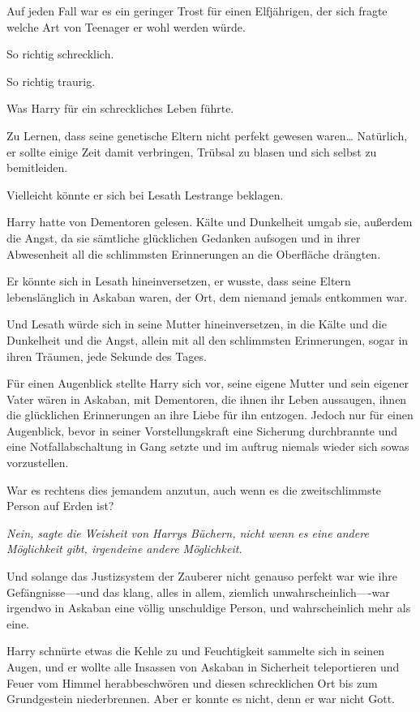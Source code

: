 {Auf jeden Fall war es ein geringer Trost für einen Elfjährigen, der sich fragte welche Art von Teenager er wohl werden würde.

So richtig schrecklich.

So richtig traurig.

Was Harry für ein schreckliches Leben führte.

Zu Lernen, dass seine genetische Eltern nicht perfekt gewesen waren… Natürlich, er sollte einige Zeit damit verbringen, Trübsal zu blasen und sich selbst zu bemitleiden.

Vielleicht könnte er sich bei Lesath Lestrange beklagen.

Harry hatte von Dementoren gelesen. Kälte und Dunkelheit umgab sie, außerdem die Angst, da sie sämtliche glücklichen Gedanken aufsogen und in ihrer Abwesenheit all die schlimmsten Erinnerungen an die Oberfläche drängten.

Er könnte sich in Lesath hineinversetzen, er wusste, dass seine Eltern lebenslänglich in Askaban waren, der Ort, dem niemand jemals entkommen war.

Und Lesath würde sich in seine Mutter hineinversetzen, in die Kälte und die Dunkelheit und die Angst, allein mit all den schlimmsten Erinnerungen, sogar in ihren Träumen, jede Sekunde des Tages.

Für einen Augenblick stellte Harry sich vor, seine eigene Mutter und sein eigener Vater wären in Askaban, mit Dementoren, die ihnen ihr Leben aussaugen, ihnen die glücklichen Erinnerungen an ihre Liebe für ihn entzogen. Jedoch nur für einen Augenblick, bevor in seiner Vorstellungskraft eine Sicherung durchbrannte und eine Notfallabschaltung in Gang setzte und im auftrug niemals wieder sich sowas vorzustellen.

War es rechtens dies jemandem anzutun, auch wenn es die zweitschlimmste Person auf Erden ist?

\emph{Nein, sagte die Weisheit von Harrys Büchern, nicht wenn es eine andere Möglichkeit gibt, irgendeine andere Möglichkeit.}

Und solange das Justizsystem der Zauberer nicht genauso perfekt war wie ihre Gefängnisse----und das klang, alles in allem, ziemlich unwahrscheinlich----war irgendwo in Askaban eine völlig unschuldige Person, und wahrscheinlich mehr als eine.

Harry schnürte etwas die Kehle zu und Feuchtigkeit sammelte sich in seinen Augen, und er wollte alle Insassen von Askaban in Sicherheit teleportieren und Feuer vom Himmel herabbeschwören und diesen schrecklichen Ort bis zum Grundgestein niederbrennen. Aber er konnte es nicht, denn er war nicht Gott.

}
